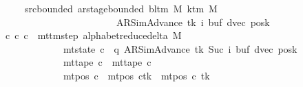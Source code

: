 \begin{isabellebody}
\ \ \ \ \ \ \ src{\isacharunderscore}{\kern0pt}bounded{\isacharcolon}{\kern0pt}\ {\isachardoublequoteopen}ar{\isacharunderscore}{\kern0pt}stage{\isacharunderscore}{\kern0pt}bounded\ {\isacharparenleft}{\kern0pt}bl{\isacharunderscore}{\kern0pt}tm\ M{\isacharparenright}{\kern0pt}\ {\isacharparenleft}{\kern0pt}k{\isacharunderscore}{\kern0pt}tm\ M{\isacharparenright}{\kern0pt}\isanewline
\ \ \ \ \ \ \ \ \ \ \ \ \ \ \ \ \ \ \ \ \ \ \ \ \ \ {\isacharparenleft}{\kern0pt}AR{\isacharunderscore}{\kern0pt}SimAdvance{\isacharcomma}{\kern0pt}\ tk{\isacharcomma}{\kern0pt}\ i{\isacharcomma}{\kern0pt}\ buf{\isacharcomma}{\kern0pt}\ dvec{\isacharcomma}{\kern0pt}\ posk{\isacharparenright}{\kern0pt}{\isachardoublequoteclose}\isanewline
\ \ \ {\isachardoublequoteopen}{\isasymexists}c{\isacharprime}{\kern0pt}{\isacharprime}{\kern0pt}{\isachardot}{\kern0pt}\ {\isacharparenleft}{\kern0pt}c{\isacharprime}{\kern0pt}{\isacharcomma}{\kern0pt}\ c{\isacharprime}{\kern0pt}{\isacharprime}{\kern0pt}{\isacharparenright}{\kern0pt}\ {\isasymin}\ mttm{\isacharunderscore}{\kern0pt}step\ {\isacharparenleft}{\kern0pt}alphabet{\isacharunderscore}{\kern0pt}reduce{\isacharunderscore}{\kern0pt}delta\ M{\isacharparenright}{\kern0pt}\isanewline
\ \ \ \ \ \ \ \ \ \ \ \ \ \ {\isasymand}\ mt{\isacharunderscore}{\kern0pt}state\ c{\isacharprime}{\kern0pt}{\isacharprime}{\kern0pt}\ {\isacharequal}{\kern0pt}\ {\isacharparenleft}{\kern0pt}q{\isacharcomma}{\kern0pt}\ AR{\isacharunderscore}{\kern0pt}SimAdvance{\isacharcomma}{\kern0pt}\ tk{\isacharcomma}{\kern0pt}\ Suc\ i{\isacharcomma}{\kern0pt}\ buf{\isacharcomma}{\kern0pt}\ dvec{\isacharcomma}{\kern0pt}\ posk{\isacharparenright}{\kern0pt}\isanewline
\ \ \ \ \ \ \ \ \ \ \ \ \ \ {\isasymand}\ mt{\isacharunderscore}{\kern0pt}tape\ c{\isacharprime}{\kern0pt}{\isacharprime}{\kern0pt}\ {\isacharequal}{\kern0pt}\ mt{\isacharunderscore}{\kern0pt}tape\ c{\isacharprime}{\kern0pt}\isanewline
\ \ \ \ \ \ \ \ \ \ \ \ \ \ {\isasymand}\ mt{\isacharunderscore}{\kern0pt}pos\ c{\isacharprime}{\kern0pt}{\isacharprime}{\kern0pt}\ {\isacharequal}{\kern0pt}\ {\isacharparenleft}{\kern0pt}mt{\isacharunderscore}{\kern0pt}pos\ c{\isacharprime}{\kern0pt}{\isacharparenright}{\kern0pt}{\isacharparenleft}{\kern0pt}tk\ {\isacharcolon}{\kern0pt}{\isacharequal}{\kern0pt}\ mt{\isacharunderscore}{\kern0pt}pos\ c{\isacharprime}{\kern0pt}\ tk\ {\isacharminus}{\kern0pt}\ {}{\isacharparenright}{\kern0pt}{\isachardoublequoteclose}\isanewline
%
\isadelimproof
%
\endisadelimproof
%
\isatagproof
{}\isamarkupfalse%
\ {\isacharminus}{\kern0pt}\isanewline

\end{isabellebody}
